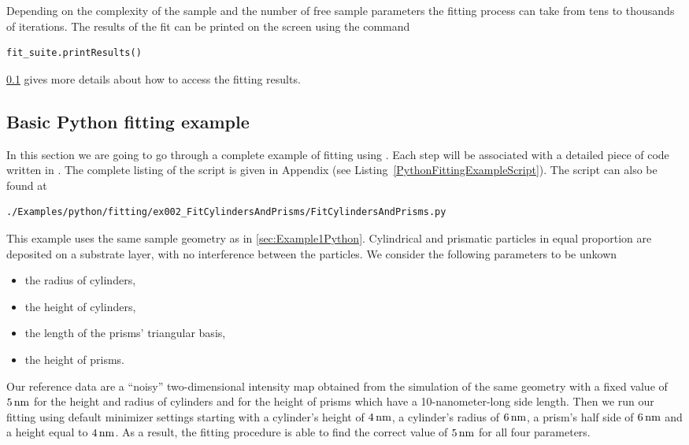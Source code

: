 Depending on the complexity of the sample and the number of free sample parameters the fitting
process can take from tens to thousands of iterations. The results of the fit can
be printed on the screen using the command
\begin{lstlisting}[language=python, style=eclipseboxed, numbers = none]
fit_suite.printResults()
\end{lstlisting}
\cref{sec:FittingExamples} gives more details about how to access the fitting results.


\subsection{Basic Python fitting example} \label{sec:FittingExamples}

In this section we are going to go through a complete example of
fitting using \BornAgain. Each  step will be associated with a
detailed piece of code written in \Python.
The complete listing of
the script is given in Appendix (see Listing~\ref{PythonFittingExampleScript}).
The script can also be found at
\begin{lstlisting}[language=shell, style=commandline]
./Examples/python/fitting/ex002_FitCylindersAndPrisms/FitCylindersAndPrisms.py
\end{lstlisting}

\noindent
This example uses the same sample geometry as in \cref{sec:Example1Python}.
Cylindrical and
prismatic particles in equal proportion are deposited on a substrate layer, with no interference
between the particles. We consider the following parameters to be unkown
\begin{itemize}
\item the radius of cylinders,
\item the height of cylinders,
\item the length of the prisms' triangular basis,
\item the height of prisms.
\end{itemize}

Our reference data are a ``noisy'' two-dimensional intensity
map obtained from the simulation of the same geometry with a fixed
value of $5\,{\rm nm}$ for the height and radius of cylinders and for the
height of prisms which have a 10-nanometer-long side length.
Then we run our fitting using default minimizer settings
starting with a cylinder's height
of $4\,{\rm nm}$, a cylinder's radius of $6\,{\rm nm}$,
a prism's half side of $6\,{\rm nm}$ and a height equal to $4\,{\rm nm}$.
As a result, the fitting procedure is able to find the correct value of $5\,{\rm nm}$
for all four parameters.


